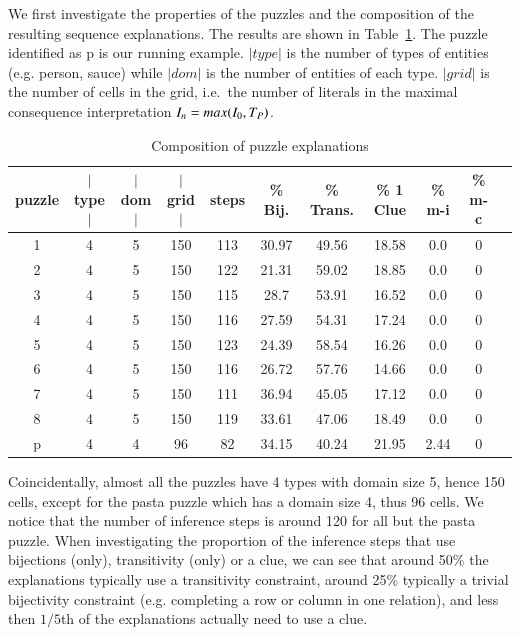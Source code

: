We first investigate the properties of the puzzles and the composition of the resulting sequence explanations. The results are shown in Table~\ref{table:composition}. The puzzle identified as p is our running example. $|type|$ is the number of types of entities (e.g. person, sauce) while $|dom|$ is the number of entities of each type. $|grid|$ is the number of cells in the grid, i.e.\ the number of literals in the maximal consequence interpretation $I_n=max(I_0,T_P)$.
\begin{table}
	\centering
\begin{tabular}{c|ccc|c|cccccc} 
	\textbf{puzzle} & \textbf{$|$type$|$} & \textbf{$|$dom$|$} & \textbf{$|$grid$|$} & \textbf{steps} & \textbf{\% Bij.} & \textbf{\% Trans.} & \textbf{\% 1 Clue} & \textbf{\% m-i} & \textbf{\% m-c} \\ 
				\hline 
				1 & 4 & 5 & 150 & 113 & 30.97 & 49.56 & 18.58 & 0.0 & 0\\ 
				2 & 4 & 5 & 150 & 122 & 21.31 & 59.02 & 18.85 & 0.0 & 0\\ 
				3 & 4 & 5 & 150 & 115 & 28.7 & 53.91 & 16.52 & 0.0 & 0\\ 
				4 & 4 & 5 & 150 & 116 & 27.59 & 54.31 & 17.24 & 0.0 & 0\\ 
				5 & 4 & 5 & 150 & 123 & 24.39 & 58.54 & 16.26 & 0.0 & 0\\ 
				6 & 4 & 5 & 150 & 116 & 26.72 & 57.76 & 14.66 & 0.0 & 0\\ 
				7 & 4 & 5 & 150 & 111 & 36.94 & 45.05 & 17.12 & 0.0 & 0\\ 
				8 & 4 & 5 & 150 & 119 & 33.61 & 47.06 & 18.49 & 0.0 & 0\\ 
				p & 4 & 4 & 96 & 82 & 34.15 & 40.24 & 21.95 & 2.44 & 0\\ 
\end{tabular}  
\caption{Composition of puzzle explanations}
\label{table:composition}
\end{table}
Coincidentally, almost all the puzzles have 4 types with domain size 5,  
hence 150 cells, except for the pasta puzzle which has a domain size 4, thus 96 cells. We notice that the number of inference steps is around 120 for all but the pasta puzzle. When investigating the proportion of the inference steps that use bijections (only), transitivity (only) or a clue, we can see that around 50\% the explanations typically use a transitivity constraint, around 25\% typically a trivial bijectivity constraint (e.g. completing a row or column in one relation), and less then $1/5$th of the explanations actually need to use a clue.
